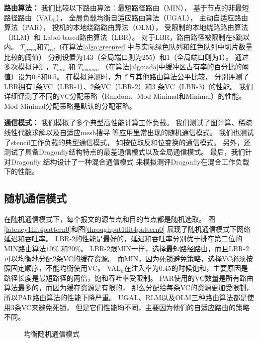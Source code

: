 \textbf{路由算法：}
我们比较以下路由算法：最短路径路由（MIN），
基于节点的非最短路径路由（VAL$_n$），
全局负载均衡自适应路由算法（UGAL），
主动自适应路由算法（PAR），
投机的本地绕路路由算法（OLM），
受限制的本地绕路路由算法（RLM）和
Label-based路由算法（LBR）。
对于LBR，路由路径被限制在8跳以内。
$T_{green}$和$T_{red}$（在算法\ref{algo:greenred}中与实际绿色队列和红色队列中切片数量比较的阈值）
分别设置为143（全局端口则为255）和1（全局端口则为1）。
通过多次模拟评测，$T_{min}$ 和 $T_{nonmin}$
（在算法\ref{algo:ada}中缓冲区占有率的百分比的阈值）设为0.8和0.5。
在模拟评测时，为了与其他路由算法公平比较，
分别评测了LBR拥有1条VC（LBR-1）、2条VC（LBR-2）和3 条VC（LBR-3）的性能。
我们详细评测了不同的VC分配策略（Random、Mod-Minimal和Minimal）的性能。
Mod-Minimal分配策略是默认的分配策略。

\textbf{通信模式：}
我们模拟了多个典型高性能计算工作负载。
我们测试了图计算、稀疏线性代数求解以及自适应mesh搜寻
等应用里常出现的随机通信模式。
我们也测试了stencil工作负载的典型通信模式，
如按位取反和位变换的通信模式。
另外，还测试了具备Dragonfly结构特点的最差通信模式以及全局通信模式。
最后，我们针对Dragonfly 结构设计了一种混合通信模式
来模拟测评Dragonfly在混合工作负载下的性能。

\subsection{随机通信模式}

在随机通信模式下，每个报文的源节点和目的节点都是随机选取。
图\ref{latency1flit4pattern0}和图\ref{throughput1flit4pattern0}
展现了随机通信模式下网络延迟和吞吐率。
LBR-2的性能是最好的，延迟和吞吐率分别优于排在第二位的MIN路由算法$10\%$ 和$20\%$。
LBR-2跟MIN一样，选择最短路经路由，而且LBR-2可以均衡地分配2条VC的缓存资源。
而MIN，因为死锁避免策略，选择VC必须按照固定顺序，不能均衡使用VC。
VAL$_n$在注入率为0.45的时候饱和，主要原因是路径长度是最短路径的两倍，饱和吞吐率受限制。
PAR使用的VC数量是所有路由算法最多的，而因为缓存资源是有限的，
那么分配给每条VC的资源更加受限制，所以PAR路由算法的性能下降严重。
UGAL、RLM以及OLM三种路由算法都是使用3条VC来避免死锁，
但是它们性能均不同，主要因为他们的自适应路由的策略不同。

\begin{figure*}[htbp]
  \centering
  \begin{minipage}[t]{\textwidth}
  \centering
  \caption{均衡随机通信模式}
  \label{fig:random}
  \end{minipage}
  \end{figure*}

